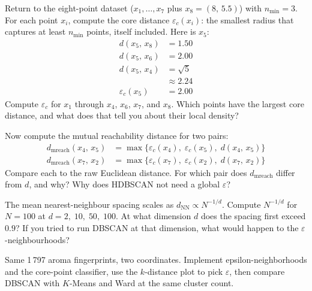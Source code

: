  Return to the eight-point dataset ($x_1,\ldots,x_7$ plus $x_8{=}(8,\,5.5)$) with $n_{\min}{=}3$.
For each point $x_i$, compute the core distance $\varepsilon_c(x_i)$: the smallest radius that captures at least $n_{\min}$ points, itself included.
Here is $x_5$:
\begin{align*}
    d(x_5,\,x_8) &= 1.50 \\[4pt]
    d(x_5,\,x_6) &= 2.00 \\[4pt]
    d(x_5,\,x_4) &= \sqrt{5} \\
                 &\approx 2.24 \\[4pt]
    \varepsilon_c(x_5) &= 2.00
\end{align*}
Compute $\varepsilon_c$ for $x_1$ through $x_4$, $x_6$, $x_7$, and $x_8$.
Which points have the largest core distance, and what does that tell you about their local density?

Now compute the mutual reachability distance for two pairs:
\begin{align*}
    d_{\mathrm{mreach}}(x_4,\,x_5) &= \max\!\big\{\varepsilon_c(x_4),\;\varepsilon_c(x_5),\;d(x_4,\,x_5)\big\} \\
    d_{\mathrm{mreach}}(x_7,\,x_2) &= \max\!\big\{\varepsilon_c(x_7),\;\varepsilon_c(x_2),\;d(x_7,\,x_2)\big\}
\end{align*}
Compare each to the raw Euclidean distance. For which pair does $d_{\mathrm{mreach}}$ differ from $d$, and why?
Why does HDBSCAN not need a global $\varepsilon$?

 The mean nearest-neighbour spacing scales as $d_{\mathrm{NN}} \propto N^{-1/d}$.
Compute $N^{-1/d}$ for $N{=}100$ at $d = 2,\; 10,\; 50,\; 100$.
At what dimension $d$ does the spacing first exceed $0.9$?
If you tried to run DBSCAN at that dimension, what would happen to the $\varepsilon$-neighbourhoods?


\vspace{2.5em}

Same 1\,797 aroma fingerprints, two coordinates.
Implement epsilon-neighborhoods and the core-point classifier,
use the $k$-distance plot to pick $\varepsilon$, then compare
DBSCAN with $K$-Means and Ward at the same cluster count.

